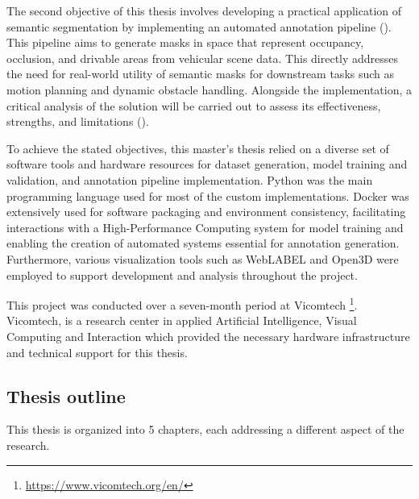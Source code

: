 The second objective of this thesis involves developing a practical application of  semantic segmentation by implementing an automated annotation pipeline (). This pipeline aims to generate masks in  space that represent occupancy, occlusion, and drivable areas from vehicular scene data. This directly addresses the need for real-world utility of  semantic masks for downstream tasks such as motion planning and dynamic obstacle handling. Alongside the implementation, a critical analysis of the solution will be carried out to assess its effectiveness, strengths, and limitations ().

To achieve the stated objectives, this master's thesis relied on a diverse set of software tools and hardware resources for dataset generation, model training and validation, and annotation pipeline implementation. Python was the main programming language used for most of the custom implementations. Docker was extensively used for software packaging and environment consistency, facilitating interactions with a High-Performance Computing system for model training and enabling the creation of automated systems essential for annotation generation. Furthermore, various visualization tools such as WebLABEL and Open3D were employed to support development and analysis throughout the project.

This project was conducted over a seven-month period at Vicomtech  \footnote{\url{https://www.vicomtech.org/en/}}. Vicomtech, is a research center in applied Artificial Intelligence, Visual Computing and Interaction which provided the necessary hardware infrastructure and technical support for this thesis.

\subsection{Thesis outline}
This thesis is organized into 5 chapters, each addressing a different aspect of the research.

